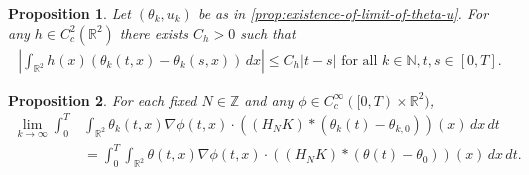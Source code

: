 \documentclass[10pt,a4paper]{amsart}
\newtheorem{prop}{Proposition}
\def\N{{\mathbb N}}
\def\R{{\mathbb R}}
\def\Z{{\mathbb Z}}
\newcommand{\abs}[1]{\left\vert#1\right\vert}
\newcommand{\iny}{\ensuremath{\infty}}
\begin{document}
    \begin{prop}\label{P:WeakTimeContinuityOfthetaSeq}
        Let $(\theta_k,u_k)$ be as in \cref{prop:existence-of-limit-of-theta-u}.
        For any $h \in C_c^2(\R^2)$ there exists $C_h > 0$ such that
        \begin{align*}
            \abs{\int_{\R^2} h(x) (\theta_k(t, x) - \theta_k(s, x)) \, dx}
                \le C_h \abs{t - s}
                \text{ for all } k \in \N, t, s \in [0, T].
        \end{align*}
    \end{prop}

    \begin{prop}\label{P:convergence2}
    For each fixed $N \in \Z$ and any $\phi \in C_c^\iny([0, T) \times \R^2)$,
    \begin{equation}\label{e:KeyNonlinearConv}
    \begin{split}
    \lim_{k\rightarrow\infty}
    	\int_0^T &\int_{\R^2} \theta_k(t, x)
        \nabla\phi(t,x) \cdot ((H_N K) *
        	(\theta_k(t) - \theta_{k,0}))(x)
            \, dx \, dt \\
        &= \int_0^T\int_{\R^2} \theta(t, x)
            \nabla\phi(t,x) \cdot ((H_N K) * (\theta(t) - \theta_0))(x)
            \, dx \, dt.
    \end{split}
    \end{equation}
    \end{prop} 
\end{document}

